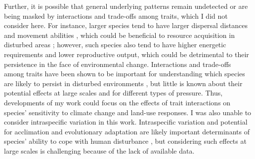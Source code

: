 Further, it is possible that general underlying patterns remain undetected or are being masked by interactions and trade-offs among traits, which I did not consider here. For instance, larger species tend to have larger dispersal distances and movement abilities \citep{Jenkins2007}, which could be beneficial to resource acquisition in disturbed areas \citep{Hillaert2018}; however, such species also tend to have higher energetic requirements \citep{White2011} and lower reproductive output, which could be detrimental to their persistence in the face of environmental change. Interactions and trade-offs among traits have been shown to be important for understanding which species are likely to persist in disturbed environments \citep{Sayol2020}, but little is known about their potential effects at large scales and for different types of pressure. Thus, developments of my work could focus on the effects of trait interactions on species' sensitivity to climate change and land-use responses. I was also unable to consider intraspecific variation in this work. Intraspecific variation and potential for acclimation and evolutionary adaptation are likely important determinants of species' ability to cope with human disturbance \citep{Carlson2014, Rohr2018}, but considering such effects at large scales is challenging because of the lack of available data.  

